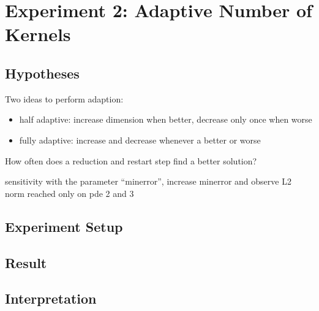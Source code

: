 \documentclass[./\jobname.tex]{subfiles}
\begin{document}
\chapter {Experiment 2: Adaptive Number of Kernels}
\label{chap:experimet_2}

\section{Hypotheses}
Two ideas to perform adaption: 
\begin{itemize}
	\item half adaptive: increase dimension when better, decrease only once when worse
	\item fully adaptive: increase and decrease whenever a better or worse
\end{itemize}

How often does a reduction and restart step find a better solution? 

sensitivity with the parameter ``minerror'', increase minerror and observe L2 norm reached only on pde 2 and 3

\section{Experiment Setup}

\section{Result}

\section{Interpretation}
\end{document}
